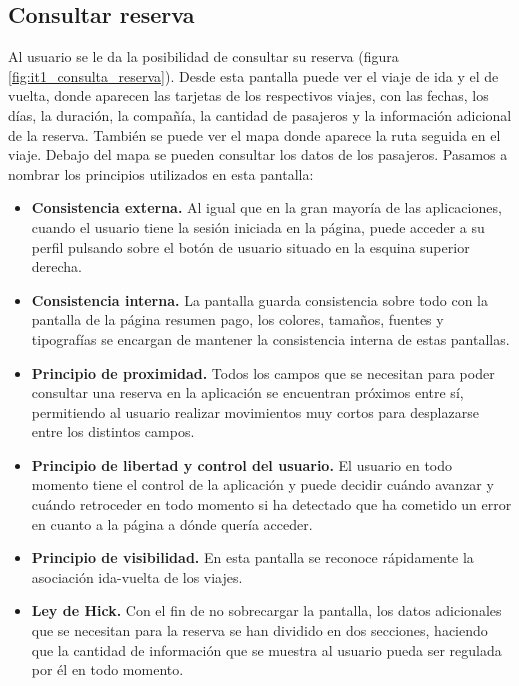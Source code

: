 \subsection{Consultar reserva}

Al usuario se le da la posibilidad de consultar su reserva (figura \ref{fig:it1_consulta_reserva}). Desde esta pantalla puede ver el viaje de ida y el
de vuelta, donde aparecen las tarjetas de los respectivos viajes, con las fechas, los días, la duración, la compañía,
la cantidad de pasajeros y la información adicional de la reserva. También se puede ver el mapa donde aparece la
ruta seguida en el viaje. Debajo del mapa se pueden consultar los datos de los pasajeros. Pasamos a nombrar los
principios utilizados en esta pantalla:

\begin{itemize}
    \item \textbf{Consistencia externa.} Al igual que en la gran mayoría de las aplicaciones, cuando el usuario
        tiene la sesión iniciada en la página, puede acceder a su perfil pulsando sobre el botón de usuario situado
        en la esquina superior derecha.
    \item \textbf{Consistencia interna.} La pantalla guarda consistencia sobre todo con la pantalla de la página
        resumen pago, los colores, tamaños, fuentes y tipografías se encargan de mantener la consistencia interna
        de estas pantallas.
    \item \textbf{Principio de proximidad.} Todos los campos que se necesitan para poder consultar una reserva en
        la aplicación se encuentran próximos entre sí, permitiendo al usuario realizar movimientos muy cortos para
        desplazarse entre los distintos campos.
    \item \textbf{Principio de libertad y control del usuario.} El usuario en todo momento tiene el control de la
        aplicación y puede decidir cuándo avanzar y cuándo retroceder en todo momento si ha detectado que ha cometido
        un error en cuanto a la página a dónde quería acceder.
    \item \textbf{Principio de visibilidad.} En esta pantalla se reconoce rápidamente la asociación ida-vuelta de los
        viajes.
    \item \textbf{Ley de Hick.} Con el fin de no sobrecargar la pantalla, los datos adicionales que se necesitan para
        la reserva se han dividido en dos secciones, haciendo que la cantidad de información que se muestra al
        usuario pueda ser regulada por él en todo momento.
\end{itemize}

